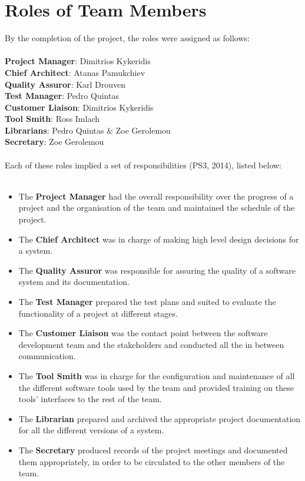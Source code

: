 \documentclass{l3proj}
\begin{document}
\section{Roles of Team Members}
\par
By the completion of the project, the roles were assigned as follows:\\
\\
\textbf{Project Manager}: Dimitrios Kykeridis\\
\textbf{Chief Architect}: Atanas Pamukchiev\\
\textbf{Quality Assuror}: Karl Drouven\\
\textbf{Test Manager}: Pedro Quintas\\
\textbf{Customer Liaison}: Dimitrios Kykeridis\\
\textbf{Tool Smith}: Ross Imlach\\
\textbf{Librarians}: Pedro Quintas \& Zoe Gerolemou\\
\textbf{Secretary}: Zoe Gerolemou\\
\\
Each of these roles implied a set of responsibilities (PS3, 2014), listed below:\\
\\
\begin{itemize}

\item The \textbf{Project Manager} had the overall responsibility over the progress of a project and the organisation of the team and maintained the schedule of the project.
\item The \textbf{Chief Architect} was in charge of making high level design decisions for a system.
\item The \textbf{Quality Assuror} was responsible for assuring the quality of a software system and its documentation.
\item The \textbf{Test Manager} prepared the test plans and suited to evaluate the functionality of a project at different stages.
\item The \textbf{Customer Liaison} was the contact point between the software development team and the stakeholders and conducted all the in between communication.
\item The \textbf{Tool Smith} was in charge for the configuration and maintenance of all the different software tools used by the team and provided training on these tools' interfaces to the rest of the team.
\item The \textbf{Librarian} prepared and archived the appropriate project documentation for all the different versions of a system.
\item The \textbf{Secretary} produced records of the project meetings and documented them appropriately, in order to be circulated to the other members of the team.

\end{itemize}
\end{document}
